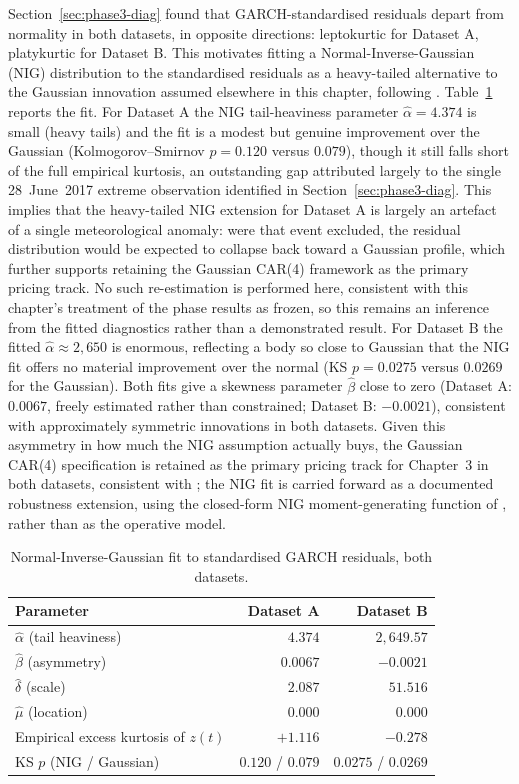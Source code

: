 \documentclass[11pt, a4paper, twoside]{article}
\begin{document}
Section~\ref{sec:phase3-diag} found that GARCH-standardised residuals depart from normality in both datasets, in opposite directions: leptokurtic for Dataset A, platykurtic for Dataset B. This motivates fitting a Normal-Inverse-Gaussian (NIG) distribution to the standardised residuals as a heavy-tailed alternative to the Gaussian innovation assumed elsewhere in this chapter, following \citet{BarndorffNielsenShephard2001}. Table~\ref{tab:nig} reports the fit. For Dataset A the NIG tail-heaviness parameter $\hat\alpha = 4.374$ is small (heavy tails) and the fit is a modest but genuine improvement over the Gaussian (Kolmogorov--Smirnov $p = 0.120$ versus $0.079$), though it still falls short of the full empirical kurtosis, an outstanding gap attributed largely to the single 28~June~2017 extreme observation identified in Section~\ref{sec:phase3-diag}. This implies that the heavy-tailed NIG extension for Dataset A is largely an artefact of a single meteorological anomaly: were that event excluded, the residual distribution would be expected to collapse back toward a Gaussian profile, which further supports retaining the Gaussian CAR(4) framework as the primary pricing track. No such re-estimation is performed here, consistent with this chapter's treatment of the phase results as frozen, so this remains an inference from the fitted diagnostics rather than a demonstrated result. For Dataset B the fitted $\hat\alpha \approx 2{,}650$ is enormous, reflecting a body so close to Gaussian that the NIG fit offers no material improvement over the normal (KS $p = 0.0275$ versus $0.0269$ for the Gaussian). Both fits give a skewness parameter $\hat\beta$ close to zero (Dataset A: $0.0067$, freely estimated rather than constrained; Dataset B: $-0.0021$), consistent with approximately symmetric innovations in both datasets. Given this asymmetry in how much the NIG assumption actually buys, the Gaussian CAR(4) specification is retained as the primary pricing track for Chapter~3 in both datasets, consistent with \citet{BenthSaltyteBenth2009}; the NIG fit is carried forward as a documented robustness extension, using the closed-form NIG moment-generating function of \citet{BrockwellMarquardt2005}, rather than as the operative model.

\begin{table}[htbp]
\centering
\caption{Normal-Inverse-Gaussian fit to standardised GARCH residuals, both datasets.}
\label{tab:nig}
\begin{tabular}{l r r}
\toprule
\textbf{Parameter} & \textbf{Dataset A} & \textbf{Dataset B} \\
\midrule
$\hat\alpha$ (tail heaviness) & $4.374$ & $2{,}649.57$ \\
$\hat\beta$ (asymmetry) & $0.0067$ & $-0.0021$ \\
$\hat\delta$ (scale) & $2.087$ & $51.516$ \\
$\hat\mu$ (location) & $0.000$ & $0.000$ \\
Empirical excess kurtosis of $z(t)$ & $+1.116$ & $-0.278$ \\
KS $p$ (NIG / Gaussian) & $0.120$ / $0.079$ & $0.0275$ / $0.0269$ \\
\bottomrule
\end{tabular}
\end{table}
\end{document}
